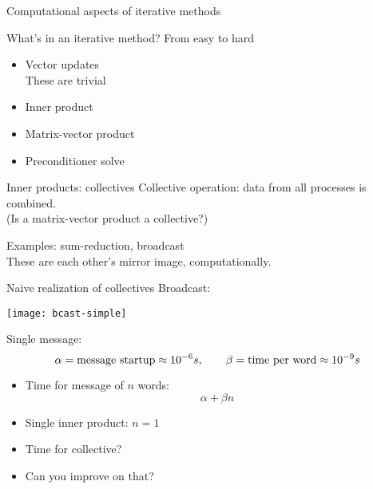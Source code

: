 
 {Computational aspects of iterative methods}

\begin{frame}{What's in an iterative method?}
  From easy to hard
  \begin{itemize}
  \item Vector updates\\
    These are trivial
  \item Inner product
  \item Matrix-vector product
  \item Preconditioner solve
  \end{itemize}
\end{frame}

\begin{frame}{Inner products: collectives}
  Collective operation: data from all processes is combined.\\
  (Is a matrix-vector product a collective?)

  Examples: sum-reduction, broadcast\\
  These are each other's mirror image, computationally.
\end{frame}

\begin{frame}{Naive realization of collectives}
  Broadcast:
  
  \texttt{[image: bcast-simple]}

  Single message:
  \[ \alpha=\hbox{message startup}\approx 10^{-6}s,\qquad
  \beta=\hbox{time per word}\approx 10^{-9}s
  \]
  \begin{itemize}
  \item<1-> Time for message of $n$ words: \[ \alpha +\beta n \]
  \item<2-> Single inner product: $n=1$
  \item<3-> Time for collective?
  \item<4-> Can you improve on that?
  \end{itemize}

\end{frame}

